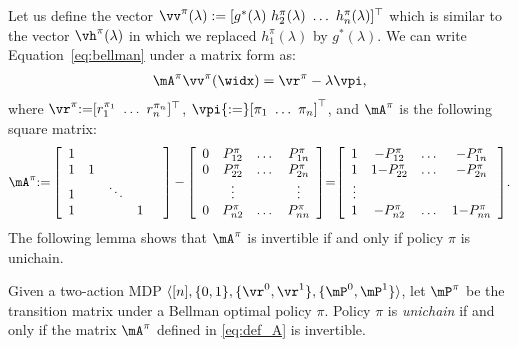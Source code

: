 Let us define the vector $\vv^\pi(\lambda):=[ g^*(\lambda)\ h^\pi_2(\lambda)\ \dots\ h^\pi_n(\lambda)]^\top$ which is similar to the vector $\vh^\pi(\lambda)$ in which we replaced $h^\pi_1(\lambda)$ by $g^*(\lambda)$. We can write Equation~\eqref{eq:bellman} under a matrix form as:
\begin{align}
    \mA^{\pi} \vv^\pi(\widx)
    = \vr^{\pi} - \lambda \vpi, \label{eq:pre_lin_eq}
\end{align}
where $\vr^{\pi}{:=}[r^{\pi_1}_1\ \dots\ r^{\pi_n}_n]^\top$, $\vpi{:=}[\pi_1\ \dots\ \pi_n]^\top$, and $\mA^{\pi}$ is the following square matrix:
\begin{align}
    {\mA^{\pi} {:=} \left[\begin{array}{cccccc}
        1 & & & &\\
        1 & 1 &  &\\
        1 & & \ddots & \\
        1 & &  &1\\
    \end{array}
\right] {-}
        \left[\begin{array}{ccccc}
                0 & P_{12}^{\pi} &\dots & P^{\pi}_{1n}\\
                0 & P_{22}^{\pi} &\dots & P^{\pi}_{2n}\\
                  &\vdots&&\vdots\\
                0 & P_{n2}^{\pi} &\dots & P^{\pi}_{nn}\\
        \end{array}
        \right]}
        {=} {\left[\begin{array}{ccccc}
                1 & - P_{12}^{\pi} & \dots & -P_{1n}^{\pi}\\
                1 & 1{-}P_{22}^{\pi} & \dots & -P_{2n}^{\pi}\\
                \vdots\\
                1 &  -P_{n2}^{\pi} & \dots &1{-}P_{nn}^{\pi}
        \end{array}\right]}. \label{eq:def_A}
\end{align}
The following lemma shows that $\mA^\pi$ is invertible if and only if policy $\pi$ is unichain.
\begin{lem}
\label{lem:invertible}
Given a two-action MDP $\langle [n], \{0,1\}, \{\vr^0,\vr^1\}, \{\mP^0,\mP^1\}\rangle$, let $\mP^\pi$ be the transition matrix under a Bellman optimal policy $\pi$.
Policy $\pi$ is \emph{unichain} if and only if the matrix $\mA^{\pi}$ defined in \eqref{eq:def_A} is invertible.
\end{lem}
